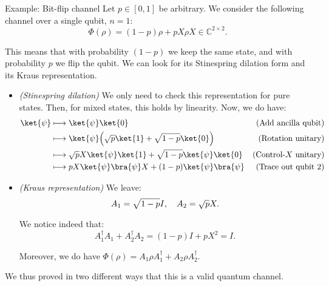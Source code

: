 \documentclass[a4paper]{article}
\begin{document}
\begin{parag}{Example: Bit-flip channel}
    Let $p \in \left[0, 1\right]$ be arbitrary. We consider the following channel over a single qubit, $n = 1$: 
    \[\Phi\left(\rho\right) = \left(1 - p\right) \rho + p X \rho X \in \mathbb{C}^{2 \times 2}.\]
    
    This means that with probability $\left(1-p\right)$ we keep the same state, and with probability $p$ we flip the qubit. We can look for its Stinespring dilation form and its Kraus representation.
    \begin{itemize}
        \item \textit{(Stinespring dilation)} We only need to check this representation for pure states. Then, for mixed states, this holds by linearity. Now, we do have:
            \begin{align*}
                \ket{\psi} & \longmapsto \ket{\psi}\ket{0} & \text{(Add ancilla qubit)} \\
                & \longmapsto  \ket{\psi}\left(\sqrt{p} \ket{1} + \sqrt{1-p} \ket{0}\right) & \text{(Rotation unitary)} \\
                & \longmapsto \sqrt{p} X \ket{\psi} \ket{1} + \sqrt{1-p} \ket{\psi} \ket{0} & \text{(Control-$X$ unitary)}\\
                & \longmapsto p X \ket{\psi}\bra{\psi} X + \left(1-p\right)\ket{\psi}\bra{\psi} & \text{(Trace out qubit 2)}
            \end{align*}
               
        \item \textit{(Kraus representation)} We leave:
        \[A_1 = \sqrt{1-p} I, \quad A_2 = \sqrt{p} X.\]

        We notice indeed that:
        \[A_1^{\dagger} A_1 + A_2^{\dagger} A_2 = \left(1-p\right)I + p X^2 = I.\]
    
        Moreover, we do have $\Phi\left(\rho\right) = A_1 \rho A_1^{\dagger} + A_2 \rho A_2^{\dagger}$.
    \end{itemize}
    
    We thus proved in two different ways that this is a valid quantum channel.
\end{parag}
\end{document}
